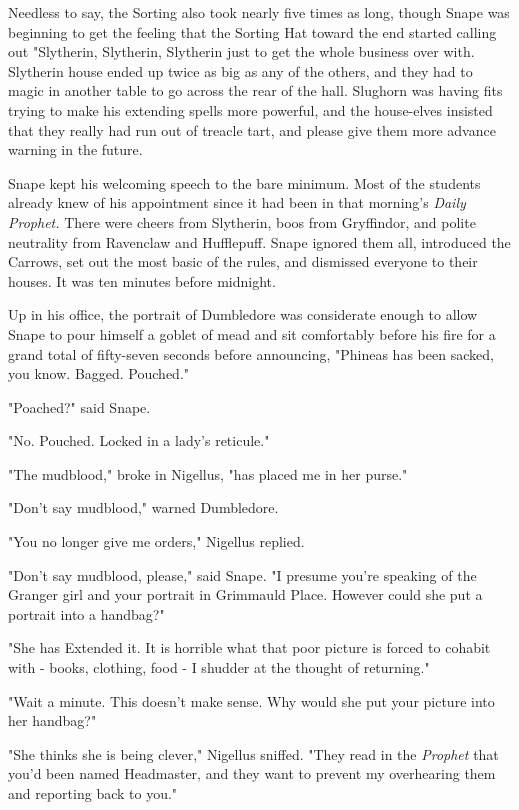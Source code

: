 Needless to say, the Sorting also took nearly five times as long, though Snape was beginning to get the feeling that the Sorting Hat toward the end started calling out "Slytherin, Slytherin, Slytherin{\el} just to get the whole business over with. Slytherin house ended up twice as big as any of the others, and they had to magic in another table to go across the rear of the hall. Slughorn was having fits trying to make his extending spells more powerful, and the house-elves insisted that they really had run out of treacle tart, and please give them more advance warning in the future.

Snape kept his welcoming speech to the bare minimum. Most of the students already knew of his appointment since it had been in that morning's \emph{Daily Prophet.} There were cheers from Slytherin, boos from Gryffindor, and polite neutrality from Ravenclaw and Hufflepuff. Snape ignored them all, introduced the Carrows, set out the most basic of the rules, and dismissed everyone to their houses. It was ten minutes before midnight.

Up in his office, the portrait of Dumbledore was considerate enough to allow Snape to pour himself a goblet of mead and sit comfortably before his fire for a grand total of fifty-seven seconds before announcing, "Phineas has been sacked, you know. Bagged. Pouched."

"Poached?" said Snape.

"No. Pouched. Locked in a lady's reticule."

"The mudblood," broke in Nigellus, "has placed me in her purse."

"Don't say mudblood," warned Dumbledore.

"You no longer give me orders," Nigellus replied.

"Don't say mudblood, please," said Snape. "I presume you're speaking of the Granger girl and your portrait in Grimmauld Place. However could she put a portrait into a handbag?"

"She has Extended it. It is horrible what that poor picture is forced to cohabit with - books, clothing, food - I shudder at the thought of returning."

"Wait a minute. This doesn't make sense. Why would she put your picture into her handbag?"

"She thinks she is being clever," Nigellus sniffed. "They read in the \emph{Prophet} that you'd been named Headmaster, and they want to prevent my overhearing them and reporting back to you."

